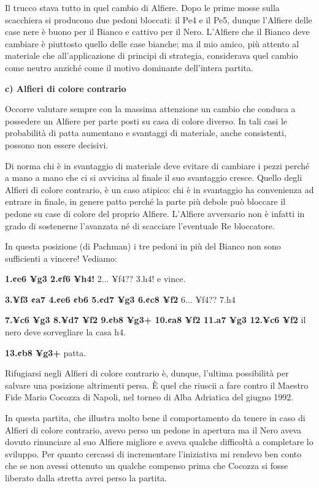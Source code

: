 Il trucco stava tutto in quel cambio di Alfiere. Dopo le prime mosse
sulla scacchiera si producono due pedoni bloccati: il Pe4 e il Pe5,
dunque l'Alfiere delle case nere è buono per il Bianco e cattivo per il
Nero. L'Alfiere che il Bianco deve cambiare è piuttosto quello delle
case bianche; ma il mio amico, più attento al materiale che
all'applicazione di principi di strategia, considerava quel cambio come
neutro anziché come il motivo dominante dell'intera partita.

\textbf{c) Alfieri di colore contrario}

Occorre valutare sempre con la massima attenzione un cambio che conduca
a possedere un Alfiere per parte posti su casa di colore diverso. In
tali casi le probabilità di patta aumentano e svantaggi di materiale,
anche consistenti, possono non essere decisivi.

Di norma chi è in svantaggio di materiale deve evitare di cambiare i
pezzi perché a mano a mano che ci si avvicina al finale il suo
svantaggio cresce. Quello degli Alfieri di colore contrario, è un caso
atipico: chi è in svantaggio ha convenienza ad entrare in finale, in
genere patto perché la parte più debole può bloccare il pedone su case
di colore del proprio Alfiere. L'Alfiere avversario non è infatti in
grado di sostenerne l'avanzata né di scacciare l'eventuale Re
bloccatore.


In questa posizione (di Pachman) i tre pedoni in più del Bianco non sono
sufficienti a vincere! Vediamo:

\textbf{1.¢e6 ¥g3 2.¢f6 ¥h4!} 2... ¥f4?? 3.h4! e vince.

\textbf{3.¥f3 ¢a7 4.¢e6 ¢b6 5.¢d7 ¥g3 6.¢c8 ¥f2} 6... ¥f4?? 7.h4

\textbf{7.¥c6 ¥g3 8.¥d7 ¥f2 9.¢b8 ¥g3+ 10.¢a8 ¥f2 11.a7 ¥g3 12.¥c6 ¥f2}
il nero deve sorvegliare la casa h4.

\textbf{13.¢b8 ¥g3+} patta.

Rifugiarsi negli Alfieri di colore contrario è, dunque, l'ultima
possibilità per salvare una posizione altrimenti persa. È quel che
riuscii a fare contro il Maestro Fide Mario Cocozza di Napoli, nel
torneo di Alba Adriatica del giugno 1992.


In
questa partita, che illustra molto bene il comportamento da tenere in
caso di Alfieri di colore contrario, avevo perso un pedone in apertura
ma il Nero aveva dovuto rinunciare al suo Alfiere migliore e aveva
qualche difficoltà a completare lo sviluppo. Per quanto cercassi di
incrementare l'iniziativa mi rendevo ben conto che se non avessi
ottenuto un qualche compenso prima che Cocozza si fosse liberato dalla
stretta avrei perso la partita.

